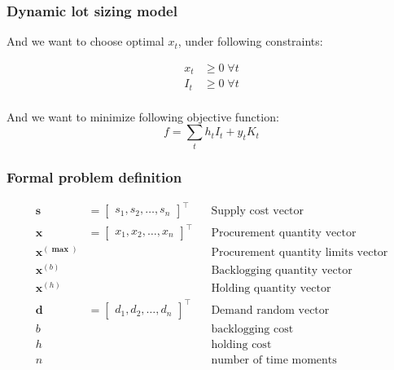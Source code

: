 \documentclass{beamer}
\begin{document}
\begin{frame}
    \frametitle{Dynamic lot sizing model}
    \begin{block}{}
        And we want to choose optimal $x_t$, under following constraints:

        \begin{align*}
          x_t &\ge 0 \; \forall t\\
          I_t &\ge 0 \; \forall t\\
        \end{align*}

        And we want to minimize following objective function:
        \begin{equation*}
          f = \sum_t{h_t I_t + y_t K_t}
        \end{equation*}
    \end{block}
\end{frame}

\begin{frame}
    \frametitle{Formal problem definition}
    \begin{align*}
        \mathbf{s} &= \begin{bmatrix}
            s_1, s_2, \dotsc, s_n
        \end{bmatrix}^\intercal && \text{Supply cost vector} \\
        \mathbf{x} &= \begin{bmatrix}
            x_1, x_2, \dotsc, x_n
        \end{bmatrix}^\intercal && \text{Procurement quantity vector} \\
        \mathbf{x^{(\max)}}  & && \text{Procurement quantity limits vector} \\
        \mathbf{x}^{(b)}  & && \text{Backlogging quantity vector} \\
        \mathbf{x}^{(h)}  & && \text{Holding quantity vector} \\
        \mathbf{d} &= \begin{bmatrix}
            d_1, d_2, \dotsc, d_n
        \end{bmatrix}^\intercal && \text{Demand random vector} \\
        b & && \text{backlogging cost} \\
        h & && \text{holding cost} \\
        n & && \text{number of time moments}
    \end{align*}
\end{frame}
\end{document}
